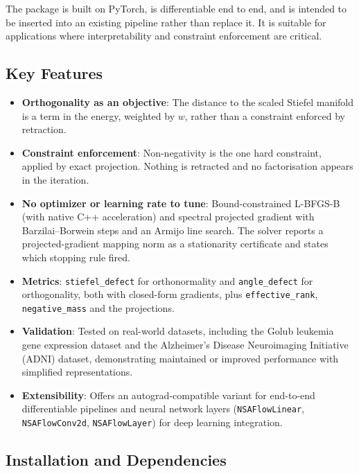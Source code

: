 \documentclass[
]{article}
\begin{document}
The package is built on PyTorch, is differentiable end to end, and is intended to be inserted into an existing pipeline rather than replace it. It is suitable for applications where interpretability and constraint enforcement are critical.

\subsection{Key Features}\label{key-features}

\begin{itemize}
\item
  \textbf{Orthogonality as an objective}: The distance to the scaled Stiefel manifold is a term in the energy, weighted by \(w\), rather than a constraint enforced by retraction.
\item
  \textbf{Constraint enforcement}: Non-negativity is the one hard constraint, applied by exact projection. Nothing is retracted and no factorisation appears in the iteration.
\item
  \textbf{No optimizer or learning rate to tune}: Bound-constrained L-BFGS-B (with native C++ acceleration) and spectral projected gradient with Barzilai--Borwein steps and an Armijo line search. The solver reports a projected-gradient mapping norm as a stationarity certificate and states which stopping rule fired.
\item
  \textbf{Metrics}: \texttt{stiefel\_defect} for orthonormality and \texttt{angle\_defect} for orthogonality, both with closed-form gradients, plus \texttt{effective\_rank}, \texttt{negative\_mass} and the projections.
\item
  \textbf{Validation}: Tested on real-world datasets, including the Golub leukemia gene expression dataset and the Alzheimer's Disease Neuroimaging Initiative (ADNI) dataset, demonstrating maintained or improved performance with simplified representations.
\item
  \textbf{Extensibility}: Offers an autograd-compatible variant for end-to-end differentiable pipelines and neural network layers (\texttt{NSAFlowLinear}, \texttt{NSAFlowConv2d}, \texttt{NSAFlowLayer}) for deep learning integration.
\end{itemize}

\subsection{Installation and Dependencies}\label{installation-and-dependencies}
\end{document}

